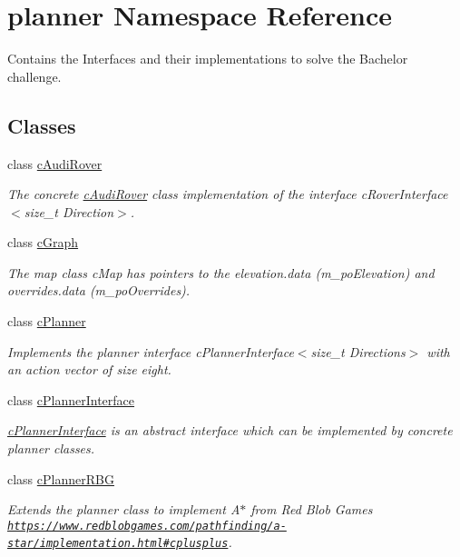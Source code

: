 \hypertarget{namespaceplanner}{}\section{planner Namespace Reference}
\label{namespaceplanner}


Contains the Interfaces and their implementations to solve the Bachelor challenge.  


\subsection*{Classes}
\begin{DoxyCompactItemize}
\item 
class \mbox{\hyperlink{classplanner_1_1c_audi_rover}{c\+Audi\+Rover}}
\begin{DoxyCompactList}\small\item\em The concrete \mbox{\hyperlink{classplanner_1_1c_audi_rover}{c\+Audi\+Rover}} class implementation of the interface c\+Rover\+Interface$<$size\+\_\+t Direction$>$. \end{DoxyCompactList}\item 
class \mbox{\hyperlink{classplanner_1_1c_graph}{c\+Graph}}
\begin{DoxyCompactList}\small\item\em The map class c\+Map has pointers to the elevation.\+data (m\+\_\+po\+Elevation) and overrides.\+data (m\+\_\+po\+Overrides). \end{DoxyCompactList}\item 
class \mbox{\hyperlink{classplanner_1_1c_planner}{c\+Planner}}
\begin{DoxyCompactList}\small\item\em Implements the planner interface c\+Planner\+Interface$<$size\+\_\+t Directions$>$ with an action vector of size eight. \end{DoxyCompactList}\item 
class \mbox{\hyperlink{classplanner_1_1c_planner_interface}{c\+Planner\+Interface}}
\begin{DoxyCompactList}\small\item\em \mbox{\hyperlink{classplanner_1_1c_planner_interface}{c\+Planner\+Interface}} is an abstract interface which can be implemented by concrete planner classes. \end{DoxyCompactList}\item 
class \mbox{\hyperlink{classplanner_1_1c_planner_r_b_g}{c\+Planner\+R\+BG}}
\begin{DoxyCompactList}\small\item\em Extends the planner class to implement A$\ast$ from Red Blob Games \href{https://www.redblobgames.com/pathfinding/a-star/implementation.html#cplusplus}{\tt https\+://www.\+redblobgames.\+com/pathfinding/a-\/star/implementation.\+html\#cplusplus}. \end{DoxyCompactList}\item 

\end{DoxyCompactItemize}

